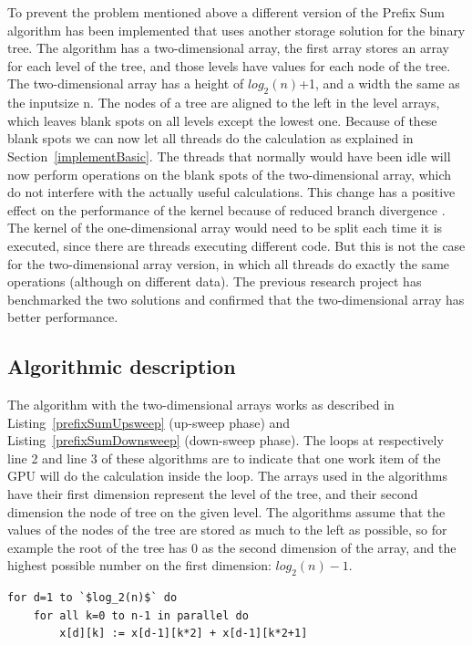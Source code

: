 \documentclass[a4paper]{article}
\begin{document}
To prevent the problem mentioned above a different version of the Prefix Sum algorithm has been implemented that uses another storage solution for the binary tree. The algorithm has a two-dimensional array, the first array stores an array for each level of the tree, and those levels have values for each node of the tree. The two-dimensional array has a height of $log_2(n)$+1, and a width the same as the inputsize n. The nodes of a tree are aligned to the left in the level arrays, which leaves blank spots on all levels except the lowest one. Because of these blank spots we can now let all threads do the calculation as explained in Section~\ref{implementBasic}. The threads that normally would have been idle will now perform operations on the blank spots of the two-dimensional array, which do not interfere with the actually useful calculations. This change has a positive effect on the performance of the kernel because of reduced branch divergence \cite{Han:ReducingBranchDivergence}. The kernel of the one-dimensional array would need to be split each time it is executed, since there are threads executing different code. But this is not the case for the two-dimensional array version, in which all threads do exactly the same operations (although on different data). The previous research project has benchmarked the two solutions and confirmed that the two-dimensional array has better performance.

\subsection{Algorithmic description} \label{sec:implAlgorithmic}
The algorithm with the two-dimensional arrays works as described in Listing~\ref{prefixSumUpsweep} (up-sweep phase) and Listing~\ref{prefixSumDownsweep} (down-sweep phase). The loops at respectively line 2 and line 3 of these algorithms are to indicate that one work item of the GPU will do the calculation inside the loop. The arrays used in the algorithms have their first dimension represent the level of the tree, and their second dimension the node of tree on the given level. The algorithms assume that the values of the nodes of the tree are stored as much to the left as possible, so for example the root of the tree has 0 as the second dimension of the array, and the highest possible number on the first dimension: $log_2(n)-1$.

\begin{lstlisting}[caption=Upsweep phase, label=prefixSumUpsweep, float=htpb]
for d=1 to `$log_2(n)$` do
	for all k=0 to n-1 in parallel do 
		x[d][k] := x[d-1][k*2] + x[d-1][k*2+1]
\end{lstlisting}
\end{document}
